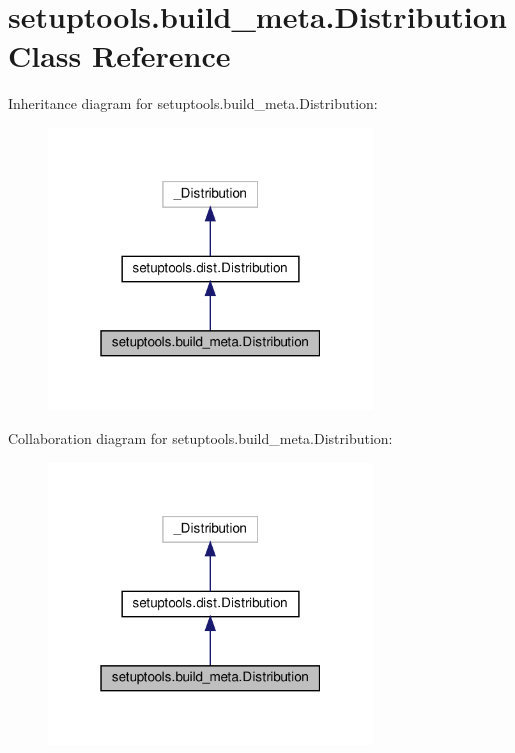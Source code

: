 \hypertarget{classsetuptools_1_1build__meta_1_1Distribution}{}\section{setuptools.\+build\+\_\+meta.\+Distribution Class Reference}
\label{classsetuptools_1_1build__meta_1_1Distribution}


Inheritance diagram for setuptools.\+build\+\_\+meta.\+Distribution\+:
\nopagebreak
\begin{figure}[H]
\begin{center}
\leavevmode
\includegraphics[width=244pt]{classsetuptools_1_1build__meta_1_1Distribution__inherit__graph}
\end{center}
\end{figure}


Collaboration diagram for setuptools.\+build\+\_\+meta.\+Distribution\+:
\nopagebreak
\begin{figure}[H]
\begin{center}
\leavevmode
\includegraphics[width=244pt]{classsetuptools_1_1build__meta_1_1Distribution__coll__graph}
\end{center}
\end{figure}
